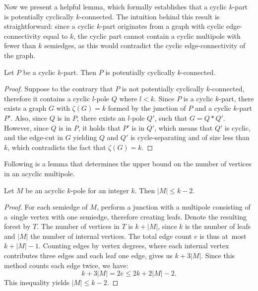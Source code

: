 \documentclass[12pt, twoside]{book}
\begin{document}
Now we present a helpful lemma, which formally establishes that a cyclic $k$-part is potentially cyclically $k$-connected. The intuition behind this result is straightforward: since a cyclic $k$-part originates from a graph with cyclic edge-connectivity equal to $k$, the cyclic part cannot contain a cyclic multipole with fewer than $k$ semiedges, as this would contradict the cyclic edge-connectivity of the graph.

\begin{lemma}\label{lem:cyclic-part-no-small-cyclic-l-pole}
	Let $P$ be a cyclic $k$-part. Then $P$ is potentially cyclically $k$-connected.
\end{lemma}

\begin{proof}
	Suppose to the contrary that $P$ is not potentially cyclically $k$-connected, therefore it contains a cyclic $l$-pole $Q$ where $l<k$. Since $P$ is a cyclic $k$-part, there exists a graph $G$ with $\zeta(G)=k$ formed by the junction of $P$ and a cyclic $k$-part $P'$. Also, since $Q$ is in $P$, there exists an $l$-pole $Q'$, such that $G=Q*Q'$. However, since $Q$ is in $P$, it holds that $P'$ is in $Q'$, which means that $Q'$ is cyclic, and the edge-cut in $G$ yielding $Q$ and $Q'$ is cycle-separating and of size less than $k$, which contradicts the fact that $\zeta(G)=k$.
\end{proof}

Following is a lemma that determines the upper bound on the number of vertices in an acyclic multipole.

\begin{lemma}\label{lem:number-of-vertices-in-acyclic-k-pole}
	Let $M$ be an acyclic $k$-pole for an integer $k$. Then $|M|\leq k-2$. 
\end{lemma}

\begin{proof}
	For each semiedge of $M$, perform a junction with a multipole consisting of a~single vertex with one semiedge, therefore creating leafs. Denote the resulting forest by $T$. The number of vertices in $T$ is $k+|M|$, since $k$ is the number of leafs and $|M|$ the number of internal vertices. The total edge count $e$ is thus at~most $k+|M|-1$. Counting edges by vertex degrees, where each internal vertex contributes three edges and each leaf one edge, gives us $k+3|M|$. Since this method counts each edge twice, we have:
	$$k+3|M|=2e\leq 2k+2|M|-2.$$
	This inequality yields $|M|\leq k-2$.
\end{proof}
\end{document}
